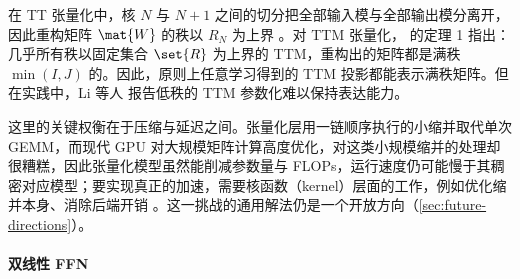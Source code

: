 在 TT 张量化中，核 $N$ 与 $N+1$ 之间的切分把全部输入模与全部输出模分离开，因此重构矩阵 $\mat{W}$ 的秩以 $R_{N}$ 为上界 \cite{oseledets2011tensor}。对 TTM 张量化，\cite{hrinchuk2020tensorized} 的定理 1 指出：几乎所有秩以固定集合 $\set{R}$ 为上界的 TTM，重构出的矩阵都是满秩 $\min(I, J)$ 的。因此，原则上任意学习得到的 TTM 投影都能表示满秩矩阵。但在实践中，Li 等人 \cite{li2022hypoformer} 报告低秩的 TTM 参数化难以保持表达能力。


这里的关键权衡在于压缩与延迟之间。张量化层用一链顺序执行的小缩并取代单次 GEMM，而现代 GPU 对大规模矩阵计算高度优化，对这类小规模缩并的处理却很糟糕，因此张量化模型虽然能削减参数量与 FLOPs，运行速度仍可能慢于其稠密对应模型；要实现真正的加速，需要核函数（kernel）层面的工作，例如优化缩并本身、消除后端开销 \cite{yang2024comera}。这一挑战的通用解法仍是一个开放方向（\cref{sec:future-directions}）。



\paragraph{双线性 FFN}


